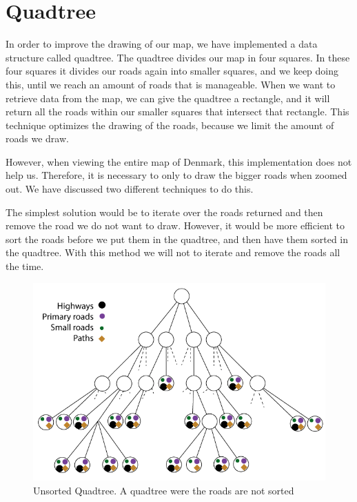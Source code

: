 \section{Quadtree}
\label{IMPL-QT}
In order to improve the drawing of our map, we have implemented a data structure 
called quadtree. The quadtree divides our map in four squares. In these four squares 
it divides our roads again into smaller squares, and we keep doing this, until we reach 
an amount of roads that is manageable.
When we want to retrieve data from the map, we can give the quadtree a
rectangle, and it will return all the roads within our smaller squares that intersect
that rectangle. This technique optimizes the drawing of the roads, because we
limit the amount of roads we draw.

However, when viewing the entire map of Denmark, this implementation does not help 
us. Therefore, it is necessary to only to draw the bigger roads when zoomed out. We 
have discussed two different techniques to do this.

The simplest solution would be to iterate over the roads returned and then
remove the road we do not want to draw. However, it would be more efficient to sort the 
roads before we put them in the quadtree, and then have them sorted in the quadtree. 
With this method we will not to iterate and remove the roads all the time.

\begin{figure}[h!]
\centering
\includegraphics[width=1\linewidth]{images/UnsortedQuadtree.png}
\caption{Unsorted Quadtree. A quadtree were the roads are not sorted}
\label{IMPL-USQ}
\end{figure}


